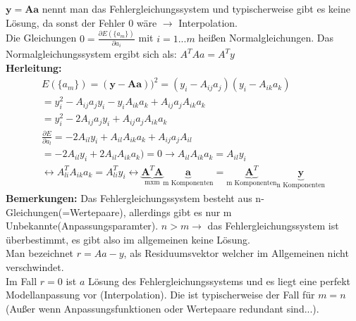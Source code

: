 \documentclass{scrartcl}
\begin{document}
$ \boldsymbol{y} = \boldsymbol{A} \boldsymbol{a}$ nennt man das Fehlergleichungssystem und typischerweise gibt es keine Lösung, da sonst der Fehler 0 wäre $\rightarrow$ Interpolation. \\
Die Gleichungen $0=\frac{\partial E(\{a_m\})}{\partial a_i}$ mit $i=1...m$ heißen Normalgleichungen.
Das Normalgleichungssystem ergibt sich als: $A^TAa=A^Ty$\\
\textbf{Herleitung:}\\
\begin{align*}
E(\{a_m\})=(\boldsymbol{y}-\boldsymbol{A} \boldsymbol{a}))^2=(y_i-A_{ij} a_j)(y_i-A_{ik} a_k)\\
=y_i^2-A_{ij} a_j y_i-y_i A_{ik} a_k +A_{ij} a_j A_{ik} a_k \\
=y_i^2 -2 A_{ij} a_j y_i +A_{ij} a_j A_{ik} a_k \\
\frac{\partial E}{\partial a_l} = -2 A_{il} y_i + A_{il} A_{ik} a_k + A_{ij} a_j A_{il}\\
=-2 A_{il} y_i +2 A_{il} A_{ik} a_k )=0 \rightarrow A_{il} A_{ik} a_k= A_{il} y_i \\
\leftrightarrow A_{li}^T A_{ik} a_k =A_{li}^T y_i \leftrightarrow \underbrace{\boldsymbol{A}^T \boldsymbol{A}}_\text{mxm} \underbrace{\boldsymbol{a}}_\text{m Komponenten} = \underbrace{\boldsymbol{A}^T}_\text{m Komponenten}
\underbrace{\boldsymbol{y}}_\text{n Komponenten}
\end{align*}
\textbf{Bemerkungen:} Das Fehlergleichungssystem besteht aus n-Gleichungen(=Wertepaare), allerdings gibt es nur m Unbekannte(Anpassungsparamter).
$n>m \rightarrow$ das Fehlergleichungssystem ist überbestimmt, es gibt also im allgemeinen keine Lösung.\\
Man bezeichnet $r=A a -y$, als Residuumsvektor welcher im Allgemeinen nicht verschwindet.\\
Im Fall $r=0$ ist $a$ Lösung des Fehlergleichungssystems und es liegt eine perfekt Modellanpassung vor (Interpolation).
Die ist typischerweise der Fall für $m=n$ (Außer wenn Anpassungsfunktionen oder Wertepaare redundant sind...).
\end{document}
